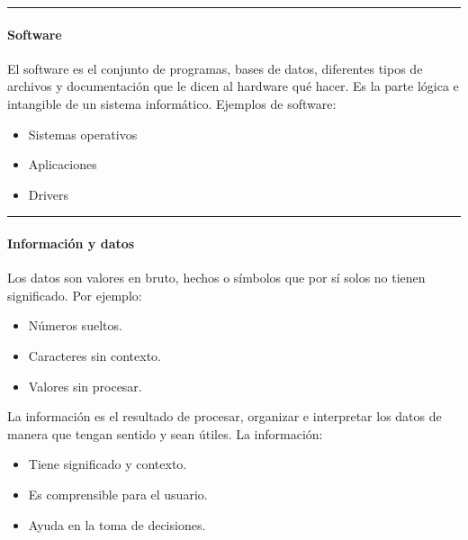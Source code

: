 \documentclass[letterpaper,10pt,spanish]{sphinxmanual}
\begin{document}
\bigskip\hrule\bigskip



\paragraph{Software}
\label{\detokenize{cursos/ofimatica11/periodo01/R01:software}}
\sphinxAtStartPar
El software es el conjunto de programas, bases de datos, diferentes tipos de archivos y documentación que le dicen al hardware qué hacer. Es la parte lógica e intangible de un sistema informático. Ejemplos de software:
\begin{itemize}
\item {} 
\sphinxAtStartPar
Sistemas operativos

\item {} 
\sphinxAtStartPar
Aplicaciones

\item {} 
\sphinxAtStartPar
Drivers

\end{itemize}


\bigskip\hrule\bigskip



\paragraph{Información y datos}
\label{\detokenize{cursos/ofimatica11/periodo01/R01:informacion-y-datos}}
\sphinxAtStartPar
Los datos son valores en bruto, hechos o símbolos que por sí solos no tienen significado. Por ejemplo:
\begin{itemize}
\item {} 
\sphinxAtStartPar
Números sueltos.

\item {} 
\sphinxAtStartPar
Caracteres sin contexto.

\item {} 
\sphinxAtStartPar
Valores sin procesar.

\end{itemize}

\sphinxAtStartPar
La información es el resultado de procesar, organizar e interpretar los datos de manera que tengan sentido y sean útiles. La información:
\begin{itemize}
\item {} 
\sphinxAtStartPar
Tiene significado y contexto.

\item {} 
\sphinxAtStartPar
Es comprensible para el usuario.

\item {} 
\sphinxAtStartPar
Ayuda en la toma de decisiones.

\end{itemize}
\end{document}
